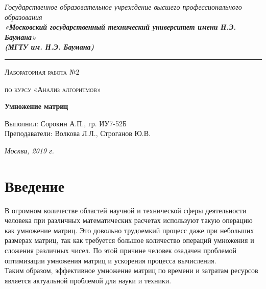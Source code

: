 \documentclass[12pt, a4paper]{report}
\begin{document}
    \begin{titlepage}

        \begin{center}
            \Large
            {\sl Государственное образовательное учреждение высшего профессионального образования\\
            {\bf«Московский государственный технический университет имени Н.Э. Баумана»\\
				(МГТУ им. Н.Э. Баумана)}}
				\noindent\rule{\textwidth}{2pt}
            \vspace{3cm}

			{\scshape\LARGE Лабораторная работа №2 \par}
			\vspace{0.5cm}	
			{\scshape\LARGE по курсу «Анализ алгоритмов» \par}
			\vspace{1.5cm}
			{\huge\bfseries Умножение матриц \par}
			\vspace{2cm}
			\Large Выполнил: Сорокин А.П., гр. ИУ7-52Б\\
			\vspace{0.5cm}
			{\Large Преподаватели: Волкова Л.Л., Строганов Ю.В.}
		
			\vfill
			\Large \textit {Москва, 2019 г.}
            
        \end{center}

    \end{titlepage}
	
	\tableofcontents

	\chapter*{Введение}
	
	\hspace{1cm}В огромном количестве областей научной и технической сферы деятельности человека при различных математических расчетах используют такую операцию как умножение матриц. Это довольно трудоемкий процесс даже при небольших размерах матриц, так как требуется большое количество операций умножения и сложения различных чисел. По этой причине человек озадачен проблемой оптимизации умножения матриц и ускорения процесса вычисления.\\
	Таким образом, эффективное умножение матриц по времени и затратам ресурсов является актуальной проблемой для науки и техники.
\end{document}
